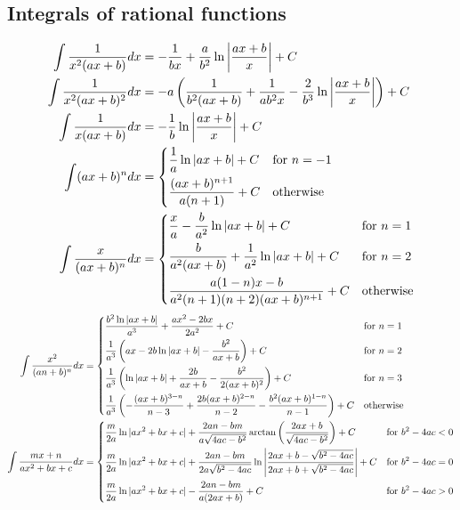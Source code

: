 \documentclass{article}
\begin{document}
\subsection{Integrals of rational functions}
\begin{align}
\int\frac{1}{x^2(ax+b)}dx&=-\frac{1}{bx}+\frac{a}{b^2}\ln\left|\frac{ax+b}{x}\right|+C\\
\int\frac{1}{x^2(ax+b)^2}dx&=-a\left(\frac{1}{b^2(ax+b)}+\frac{1}{ab^2x}-\frac{2}{b^3}\ln\left|\frac{ax+b}{x}\right|\right)+C\\
\int\frac{1}{x(ax+b)}dx&=-\frac{1}{b}\ln\left|\frac{ax+b}{x}\right|+C\\
\int(ax+b)^ndx&=
\begin{dcases}
\frac{1}{a}\ln|ax+b|+C&\mathrm{for\ }n=-1\\
\frac{(ax+b)^{n+1}}{a(n+1)}+C&\mathrm{otherwise}
\end{dcases}
\\
\int\frac{x}{(ax+b)^n}dx&=
\begin{dcases}
\frac{x}{a}-\frac{b}{a^2}\ln|ax+b|+C&\mathrm{for\ }n=1\\
\frac{b}{a^2(ax+b)}+\frac{1}{a^2}\ln|ax+b|+C&\mathrm{for\ }n=2\\
\frac{a(1-n)x-b}{a^2(n+1)(n+2)(ax+b)^{n+1}}+C&\mathrm{otherwise}
\end{dcases}
\end{align}
\begin{align}
\int\frac{x^2}{(an+b)^n}dx&=
\begin{dcases}
\frac{b^2\ln|ax+b|}{a^3}+\frac{ax^2-2bx}{2a^2}+C&\mathrm{for\ }n=1\\
\frac{1}{a^3}\left(ax-2b\ln|ax+b|-\frac{b^2}{ax+b}\right)+C&\mathrm{for\ }n=2\\
\frac{1}{a^3}\left(\ln|ax+b|+\frac{2b}{ax+b}-\frac{b^2}{2(ax+b)^2}\right)+C&\mathrm{for\ }n=3\\
\frac{1}{a^3}\left(-\frac{(ax+b)^{3-n}}{n-3}+\frac{2b(ax+b)^{2-n}}{n-2}-\frac{b^2(ax+b)^{1-n}}{n-1}\right)+C&\mathrm{otherwise}
\end{dcases}
\\
\int\frac{mx+n}{ax^2+bx+c}dx&=
\begin{dcases}
\frac{m}{2a}\ln|ax^2+bx+c|+\frac{2an-bm}{a\sqrt{4ac-b^2}}\arctan\left(\frac{2ax+b}{\sqrt{4ac-b^2}}\right)+C&\mathrm{for\ }b^2-4ac<0\\
\frac{m}{2a}\ln|ax^2+bx+c|+\frac{2an-bm}{2a\sqrt{b^2-4ac}}\ln\left|\frac{2ax+b-\sqrt{b^2-4ac}}{2ax+b+\sqrt{b^2-4ac}}\right|+C&\mathrm{for\ }b^2-4ac=0\\
\frac{m}{2a}\ln|ax^2+bx+c|-\frac{2an-bm}{a(2ax+b)}+C&\mathrm{for\ }b^2-4ac>0
\end{dcases}
\end{align}
\end{document}
